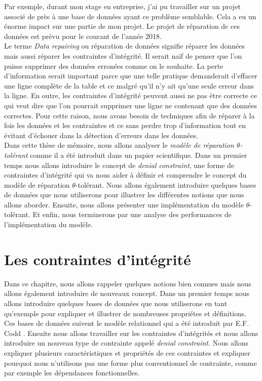 \documentclass[letterpaper, 12pt]{report}
\theoremstyle{definition}
\newcommand{\alinea}{
\hspace*{0.5cm}}
\begin{document}
Par exemple, durant mon stage en entreprise, j'ai pu travailler sur un projet associé de près à une base de données ayant ce problème semblable. Cela a eu un énorme impact sur une partie de mon projet. Le projet de réparation de ces données est prévu pour le courant de l'année 2018.\\

Le terme \emph{Data repairing} ou réparation de données signifie réparer les données mais aussi réparer les contraintes d'intégrité. Il serait naïf de penser que l'on puisse supprimer des données erronées comme on le souhaite. La perte d'information serait important parce que une telle pratique demanderait d'effacer une ligne complète de la table et ce malgré qu'il n'y ait qu'une seule erreur dans la ligne. En outre, les contraintes d'intégrité peuvent aussi ne pas être correcte ce qui veut dire que l'on pourrait supprimer une ligne ne contenant que des données correctes. Pour cette raison, nous avons besoin de techniques afin de réparer à la fois les données et les contraintes et ce sans perdre trop d'information tout en évitant d'échouer dans la détection d'erreurs dans les données.\\

Dans cette thèse de mémoire, nous allons analyser le \emph{modèle de réparation $\theta$-tolérant} comme il a été introduit dans un papier scientifique\cite{main}. Dans un premier temps nous allons introduire le concept de \emph{denial constraint}, une forme de contraintes d'intégrité qui va nous aider à définir et comprendre le concept du modèle de réparation $\theta$-tolérant. Nous allons également introduire quelques bases de données que nous utiliserons pour illustrer les différentes notions que nous allons aborder. Ensuite, nous allons présenter une implémentation du modèle $\theta$-tolérant. Et enfin, nous terminerons par une analyse des performances de l'implémentation du modèle.

\chapter{Les contraintes d'intégrité}

\alinea Dans ce chapitre, nous allons rappeler quelques notions bien connues mais nous allons également introduire de nouveaux concept. Dans un premier temps nous allons introduire quelques bases de données que nous utiliserons en tant qu'exemple pour expliquer et illustrer de nombreuses propriétes et définitions. Ces bases de données suivent le modèle relationnel qui a été introduit par E.F. Codd \cite{misc1}. Ensuite nous allons travailler sur les contraintes d'intégrités et nous allons introduire un nouveau type de contrainte appelé \emph{denial constraint}. Nous allons expliquer plusieurs caractéristiques et propriétés de ces contraintes et expliquer pourquoi nous n'utilisons pas une forme plus conventionnel de contrainte, comme par exemple les dépendances fonctionnelles.
\end{document}
